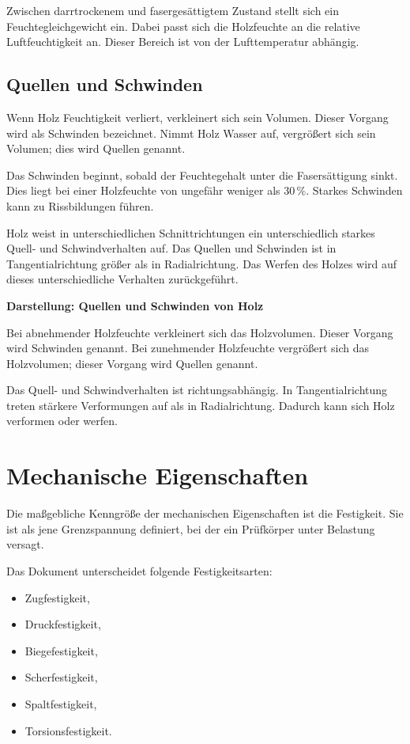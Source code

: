 \documentclass[
  12pt,
  a4paper,
  oneside
]{scrreprt}
\begin{document}
Zwischen darrtrockenem und fasergesättigtem Zustand stellt sich ein
Feuchtegleichgewicht ein. Dabei passt sich die Holzfeuchte an die
relative Luftfeuchtigkeit an. Dieser Bereich ist von der
Lufttemperatur abhängig. 

\subsection{Quellen und Schwinden}

Wenn Holz Feuchtigkeit verliert, verkleinert sich sein Volumen. Dieser
Vorgang wird als Schwinden bezeichnet. Nimmt Holz Wasser auf, vergrößert
sich sein Volumen; dies wird Quellen genannt. 

Das Schwinden beginnt, sobald der Feuchtegehalt unter die Fasersättigung
sinkt. Dies liegt bei einer Holzfeuchte von ungefähr weniger als
$30\,\%$. Starkes Schwinden kann zu Rissbildungen führen.


Holz weist in unterschiedlichen Schnittrichtungen ein unterschiedlich
starkes Quell- und Schwindverhalten auf. Das Quellen und Schwinden ist
in Tangentialrichtung größer als in Radialrichtung. Das Werfen des
Holzes wird auf dieses unterschiedliche Verhalten zurückgeführt.


\begin{darstellungsbox}
\textbf{Darstellung: Quellen und Schwinden von Holz}

Bei abnehmender Holzfeuchte verkleinert sich das Holzvolumen. Dieser
Vorgang wird Schwinden genannt. Bei zunehmender Holzfeuchte vergrößert
sich das Holzvolumen; dieser Vorgang wird Quellen genannt.

Das Quell- und Schwindverhalten ist richtungsabhängig. In
Tangentialrichtung treten stärkere Verformungen auf als in
Radialrichtung. Dadurch kann sich Holz verformen oder werfen.
\end{darstellungsbox}

\section{Mechanische Eigenschaften}

Die maßgebliche Kenngröße der mechanischen Eigenschaften ist die
Festigkeit. Sie ist als jene Grenzspannung definiert, bei der ein
Prüfkörper unter Belastung versagt. 

Das Dokument unterscheidet folgende Festigkeitsarten:

\begin{itemize}
  \item Zugfestigkeit,
  \item Druckfestigkeit,
  \item Biegefestigkeit,
  \item Scherfestigkeit,
  \item Spaltfestigkeit,
  \item Torsionsfestigkeit.
\end{itemize}
\end{document}
